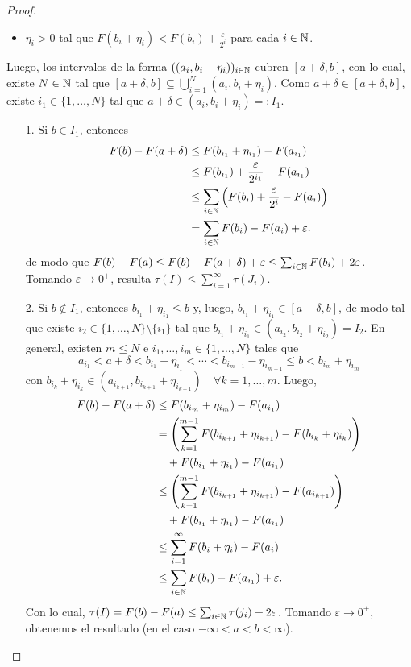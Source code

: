 \begin{proof}
\begin{enumerate}
\begin{itemize}
			\item $\eta_i > 0$ tal que $F(b_i + \eta_i) < F(b_i) + \frac{\varepsilon}{2^i}$ para cada $i \in \mathbb{N}$.
		\end{itemize}
		Luego, los intervalos de la forma $((a_i,b_i + \eta_i))_{i\in\mathbb{N}}$ cubren $[a + \delta, b]$, con lo cual, existe $N \in \mathbb{N}$ tal que $[a + \delta,b] \subseteq \bigcup_{i=1}^{N} (a_i, b_i + \eta_i)$. Como $a + \delta \in [a + \delta,b]$, existe $i_1 \in \{1,\dots,N\}$ tal que $a + \delta \in (a_i,b_i + \eta_i) =: I_1$.
		\begin{enumerate}
			\item[1.] Si $b \in I_1$, entonces
			\begin{align*}
				F(b) - F(a + \delta) &\leq F(b_{i_1} + \eta_{i_1}) - F(a_{i_1}) \\
				&\leq F(b_{i_1}) + \frac{\varepsilon}{2^{i_{1}}} - F(a_{i_{1}}) \\
				&\leq \sum_{i\in\mathbb{N}} \left(F(b_i) + \frac{\varepsilon}{2^i} - F(a_i)\right) \\
				&= \sum_{i\in\mathbb{N}} F(b_i) - F(a_i) + \varepsilon
			.\end{align*}
			de modo que $F(b) - F(a) \leq F(b) - F(a + \delta) + \varepsilon \leq \sum_{i\in\mathbb{N}}^{} F(b_i) + 2 \varepsilon$. Tomando $\varepsilon \longrightarrow 0^+$, resulta $\tau(I) \leq \sum_{i=1}^{\infty} \tau(J_i)$. \checkmark

			\item[2.] Si $b \not\in I_1$, entonces $b_{i_{1}} + \eta_{i_{1}} \leq b$ y, luego, $b_{i_{1}} + \eta_{i_{1}} \in [a+\delta,b]$, de modo tal que existe $i_{2} \in \{1,\dots,N\} \setminus \{i_{1}\}$ tal que $b_{i_{1}} + \eta_{i_{1}} \in (a_{i_{2}},b_{i_{2}}+\eta_{i_{2}}) = I_2$. En general, existen $m \leq N$ e $i_1,\dots,i_m \in \{1,\dots,N\}$ tales que
			\[ a_{i_{1}} < a + \delta < b_{i_{1}} + \eta_{i_{1}} < \cdots < b_{i_{m-1}} - \eta_{i_{m-1}} \leq b < b_{i_m} + \eta_{i_m} \]
			con $b_{i_k} + \eta_{i_k} \in (a_{i_{k+1}}, b_{i_{k+1}} + \eta_{i_{k+1}}) \quad \forall k = 1,\dots,m$. Luego,
			\begin{align*}
				F(b) - F(a + \delta) &\leq F(b_{i_m} + \eta_{i_m}) - F(a_{i_1}) \\
				&= \left( \sum_{k=1}^{m-1} F(b_{i_{k+1}} + \eta_{i_{k+1}}) - F(b_{i_k} + \eta_{i_k}) \right) \\
				& \quad + F(b_{i_{1}} + \eta_{i_{1}}) - F(a_{i_{1}}) \\
				&\leq \left( \sum_{k=1}^{m-1} F(b_{i_{k+1}} + \eta_{i_{k+1}}) - F(a_{i_{k+1}}) \right) \\
				& \quad + F(b_{i_{1}} + \eta_{i_{1}}) - F(a_{i_{1}}) \\
				&\leq \sum_{i=1}^{\infty} F(b_i + \eta_i) - F(a_i) \\
				&\leq \sum_{i\in\mathbb{N}} F(b_i) - F(a_{i_{1}}) + \varepsilon
			.\end{align*}
			Con lo cual, $\tau(I) = F(b) - F(a) \leq \sum_{i\in\mathbb{N}} \tau(j_i) + 2\varepsilon$. Tomando $\varepsilon \longrightarrow 0^+$, obtenemos el resultado (en el caso $-\infty < a < b < \infty$).


\end{enumerate}
\end{enumerate}
\end{proof}
